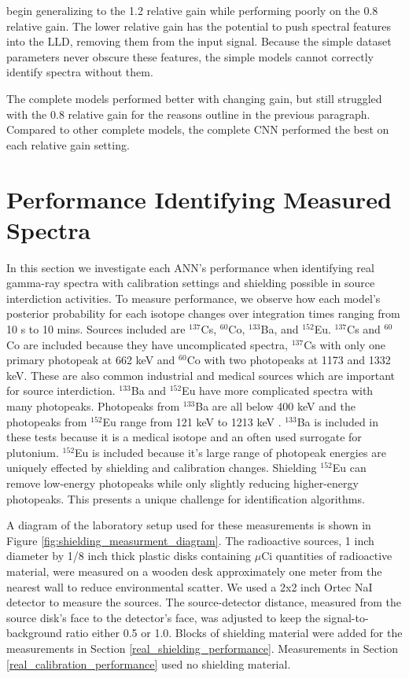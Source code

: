 begin generalizing to the 1.2 relative gain while performing poorly on the 0.8 relative gain. The lower relative gain has the potential to push spectral features into the LLD, removing them from the input signal. Because the simple dataset parameters never obscure these features, the simple models cannot correctly identify spectra without them.

The complete models performed better with changing gain, but still struggled with the 0.8 relative gain for the reasons outline in the previous paragraph. Compared to other complete models, the complete CNN performed the best on each relative gain setting.

\section{Performance Identifying Measured Spectra}

In this section we investigate each ANN's performance when identifying real gamma-ray spectra with calibration settings and shielding possible in source interdiction activities. To measure performance, we observe how each model's posterior probability for each isotope changes over integration times ranging from 10 s to 10 mins. Sources included are $^{137}$Cs, $^{60}$Co, $^{133}$Ba, and $^{152}$Eu. $^{137}$Cs and $^{60}$Co are included because they have uncomplicated spectra, $^{137}$Cs with only one primary photopeak at 662 keV and $^{60}$Co with two photopeaks at 1173 and 1332 keV. These are also common industrial and medical sources which are important for source interdiction. $^{133}$Ba and $^{152}$Eu have more complicated spectra with many photopeaks. Photopeaks from $^{133}$Ba are all below 400 keV and the photopeaks from $^{152}$Eu range from 121 keV to 1213 keV \cite{bigbluebook}. $^{133}$Ba is included in these tests because it is a medical isotope and an often used surrogate for plutonium. $^{152}$Eu is included because it's large range of photopeak energies are uniquely effected by shielding and calibration changes. Shielding $^{152}$Eu can remove low-energy photopeaks while only slightly reducing higher-energy photopeaks. This presents a unique challenge for identification algorithms.

A diagram of the laboratory setup used for these measurements is shown in Figure \ref{fig:shielding_measurment_diagram}. The radioactive sources, 1 inch diameter by 1/8 inch thick plastic disks containing $\mu$Ci quantities of radioactive material, were measured on a wooden desk approximately one meter from the nearest wall to reduce environmental scatter. We used a 2x2 inch Ortec NaI detector to measure the sources. The source-detector distance, measured from the source disk's face to the detector's face, was adjusted to keep the signal-to-background ratio either 0.5 or 1.0. Blocks of shielding material were added for the measurements in Section \ref{real_shielding_performance}. Measurements in Section \ref{real_calibration_performance} used no shielding material. 

